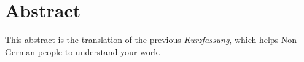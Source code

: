 \chapter*{Abstract}
\label{cha:abtract} 

This abstract is the translation of the previous \emph{Kurzfassung}, which helps Non-German people to understand your work.

